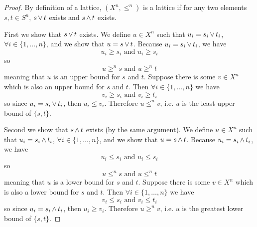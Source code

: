 	\begin{proof}
		By definition of a lattice, $(X^n, \le^n)$ is a lattice if for any two elements $s, t \in S^n$, $s \operatorname{\vee} t$ exists and $s \operatorname{\wedge} t$ exists.

		First we show that $s \operatorname{\vee} t$ exists. We define $u \in X^n$ such that $u_i = s_i \operatorname{\vee} t_i$, $\forall i \in \{1, \ldots, n\}$, and we show that $u = s \operatorname{\vee} t$. Because $u_i = s_i \operatorname{\vee} t_i$, we have
		\[
			u_i \ge s_i \textrm{ and } u_i \ge s_i
		\]
		so
		\[
			u \ge^n s \textrm{ and } u \ge^n t
		\]
		meaning that $u$ is an upper bound for $s$ and $t$. Suppose there is some $v \in X^n$ which is also an upper bound for $s$ and $t$. Then $\forall i \in \{1, \ldots, n\}$ we have
		\[
			v_i \ge s_i \textrm{ and } v_i \ge t_i
		\]
		so since $u_i = s_i \operatorname{\vee} t_i$, then $u_i \le v_i$. Therefore $u \le^n v$, i.e. $u$ is the least upper bound of $\{s, t\}$.

		Second we show that $s \operatorname{\wedge} t$ exists (by the same argument). We define $u \in X^n$ such that $u_i = s_i \operatorname{\wedge} t_i$, $\forall i \in \{1, \ldots, n\}$, and we show that $u = s \operatorname{\wedge} t$. Because $u_i = s_i \operatorname{\wedge} t_i$, we have
		\[
			u_i \le s_i \textrm{ and } u_i \le s_i
		\]
		so
		\[
			u \le^n s \textrm{ and } u \le^n t
		\]
		meaning that $u$ is a lower bound for $s$ and $t$. Suppose there is some $v \in X^n$ which is also a lower bound for $s$ and $t$. Then $\forall i \in \{1, \ldots, n\}$ we have
		\[
			v_i \le s_i \textrm{ and } v_i \le t_i
		\]
		so since $u_i = s_i \operatorname{\wedge} t_i$, then $u_i \ge v_i$. Therefore $u \ge^n v$, i.e. $u$ is the greatest lower bound of $\{s, t\}$.
	\end{proof}
